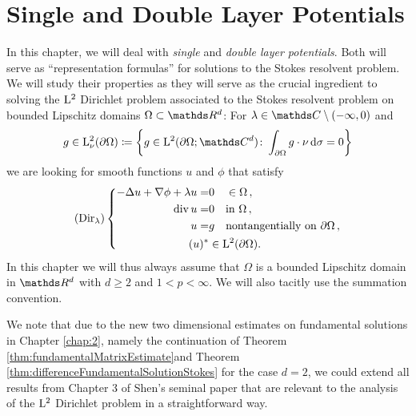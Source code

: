 \chapter{Single and Double Layer Potentials}
\label{chap:3}

In this chapter, we will deal with \emph{single} and \emph{double layer potentials}.
Both will serve as ``representation formulas'' for solutions to the Stokes resolvent problem.
We will study their properties as they will serve as the crucial ingredient to solving the $\mathrm{L}^2$ Dirichlet problem associated to the Stokes resolvent problem on bounded Lipschitz domains $\Omega \subset \R^d$:
For $\lambda \in \C \setminus (-\infty,0)$ and
\begin{align*}
  g \in \Ell^2_\nu(\partial\Omega) \coloneqq \bigg\{g \in \Ell^2(\partial\Omega; \C^d) \colon \int_{\partial\Omega} g \cdot \nu \d \sigma = 0\bigg\}
\end{align*}
we are looking for smooth functions $u$ and $\phi$ that satisfy
\begin{align*}
  (\mathrm{Dir}_\lambda)
  \left\{
  \begin{alignedat}{1}
    -\Delta u + \nabla \phi + \lambda u =& 0 \quad\in\Omega\,, \\
    \mathrm{div\,} u =& 0 \quad\text{in } \Omega\,, \\ 
    u =& g  \quad\text{nontangentially on } \partial\Omega\,, \\
    (u)^* &\in \mathrm{L}^2(\partial\Omega).
  \end{alignedat}
    \right.
\end{align*}
In this chapter we will thus always assume that $\Omega$ is a bounded Lipschitz domain in $\R^d$ with $d \geq 2$ and $1 < p < \infty$.
We will also tacitly use the summation convention.

We note that due to the new two dimensional estimates on fundamental solutions in Chapter \ref{chap:2}, namely the continuation of  Theorem \ref{thm:fundamentalMatrixEstimate}and Theorem \ref{thm:differenceFundamentalSolutionStokes} for the case $d=2$, we could extend all results from Chapter 3 of Shen's seminal paper \cite{Shen2012} that are relevant to the analysis of the $\mathrm{L}^2$ Dirichlet problem in a straightforward way.

